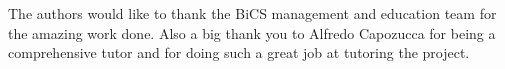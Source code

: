 
The authors would like to thank the BiCS management and education team
for the amazing work done. Also a big thank you to Alfredo Capozucca
for being a comprehensive tutor and for doing such a great job at
tutoring the project.
